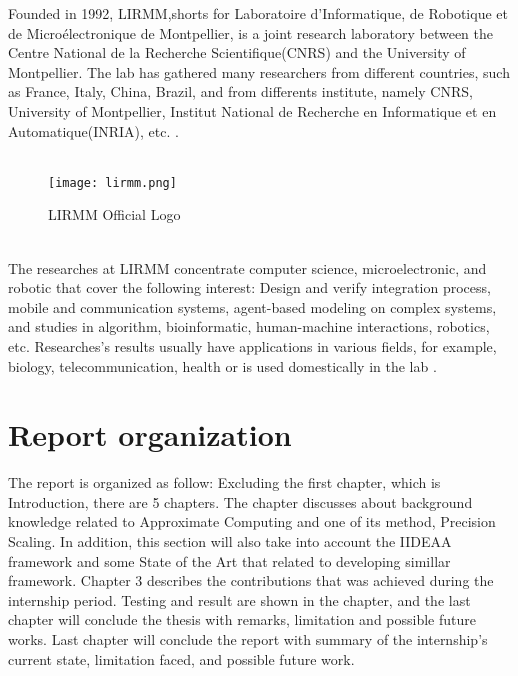 Founded in 1992, LIRMM,shorts for Laboratoire d'Informatique, de Robotique et de Microélectronique de Montpellier, is a joint research laboratory between the Centre National de la Recherche Scientifique(CNRS) and the University of Montpellier. The lab has gathered many researchers from different countries, such as France, Italy, China, Brazil, and from differents institute, namely CNRS, University of Montpellier, Institut National de Recherche en Informatique et en Automatique(INRIA), etc. \cite{LIRMM}.~\\
~\\
\begin{figure}[h]
\texttt{[image: lirmm.png]}
\centering
\caption{LIRMM Official Logo}
\end{figure}
~\\
The researches at LIRMM concentrate computer science, microelectronic, and robotic that cover the following interest: Design and verify integration process, mobile and communication systems, agent-based modeling on complex systems, and studies in algorithm, bioinformatic, human-machine interactions, robotics, etc. Researches's results usually have applications in various fields, for example, biology, telecommunication, health or is used domestically in the lab \cite{LIRMM}. ~\\ 
\vspace*{3cm}


\section{Report organization}

The report is organized as follow: Excluding the first chapter, which is Introduction, there are 5 chapters. The  chapter discusses about background knowledge related to Approximate Computing and one of its method, Precision Scaling. In addition, this section will also take into account the IIDEAA framework and some State of the Art that related to developing simillar framework. Chapter 3 describes the contributions that was achieved during the internship period. Testing and result are shown in the  chapter, and the last chapter will conclude the thesis with remarks, limitation and possible future works. Last chapter will conclude the report with summary of the internship's current state, limitation faced, and possible future work. 